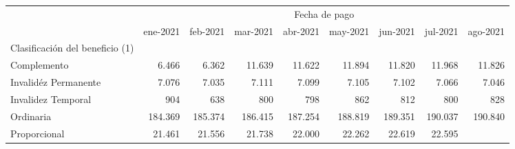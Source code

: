 \begin{tabular}{lllllllll}
\cline{1-9}
\multicolumn{1}{c}{} &
  \multicolumn{8}{|c}{Fecha de pago} \\
\multicolumn{1}{c}{} &
  \multicolumn{1}{|r}{ene-2021} &
  \multicolumn{1}{r}{feb-2021} &
  \multicolumn{1}{r}{mar-2021} &
  \multicolumn{1}{r}{abr-2021} &
  \multicolumn{1}{r}{may-2021} &
  \multicolumn{1}{r}{jun-2021} &
  \multicolumn{1}{r}{jul-2021} &
  \multicolumn{1}{r}{ago-2021} \\
\cline{1-9}
\multicolumn{1}{l}{Clasificación del beneficio (1)} &
  \multicolumn{1}{|r}{} &
  \multicolumn{1}{r}{} &
  \multicolumn{1}{r}{} &
  \multicolumn{1}{r}{} &
  \multicolumn{1}{r}{} &
  \multicolumn{1}{r}{} &
  \multicolumn{1}{r}{} &
  \multicolumn{1}{r}{} \\
\multicolumn{1}{l}{\hspace{1em}Complemento} &
  \multicolumn{1}{|r}{6.466} &
  \multicolumn{1}{r}{6.362} &
  \multicolumn{1}{r}{11.639} &
  \multicolumn{1}{r}{11.622} &
  \multicolumn{1}{r}{11.894} &
  \multicolumn{1}{r}{11.820} &
  \multicolumn{1}{r}{11.968} &
  \multicolumn{1}{r}{11.826} \\
\multicolumn{1}{l}{\hspace{1em}Invalidéz Permanente} &
  \multicolumn{1}{|r}{7.076} &
  \multicolumn{1}{r}{7.035} &
  \multicolumn{1}{r}{7.111} &
  \multicolumn{1}{r}{7.099} &
  \multicolumn{1}{r}{7.105} &
  \multicolumn{1}{r}{7.102} &
  \multicolumn{1}{r}{7.066} &
  \multicolumn{1}{r}{7.046} \\
\multicolumn{1}{l}{\hspace{1em}Invalidez Temporal} &
  \multicolumn{1}{|r}{904} &
  \multicolumn{1}{r}{638} &
  \multicolumn{1}{r}{800} &
  \multicolumn{1}{r}{798} &
  \multicolumn{1}{r}{862} &
  \multicolumn{1}{r}{812} &
  \multicolumn{1}{r}{800} &
  \multicolumn{1}{r}{828} \\
\multicolumn{1}{l}{\hspace{1em}Ordinaria} &
  \multicolumn{1}{|r}{184.369} &
  \multicolumn{1}{r}{185.374} &
  \multicolumn{1}{r}{186.415} &
  \multicolumn{1}{r}{187.254} &
  \multicolumn{1}{r}{188.819} &
  \multicolumn{1}{r}{189.351} &
  \multicolumn{1}{r}{190.037} &
  \multicolumn{1}{r}{190.840} \\
\multicolumn{1}{l}{\hspace{1em}Proporcional} &
  \multicolumn{1}{|r}{21.461} &
  \multicolumn{1}{r}{21.556} &
  \multicolumn{1}{r}{21.738} &
  \multicolumn{1}{r}{22.000} &
  \multicolumn{1}{r}{22.262} &
  \multicolumn{1}{r}{22.619} &
  \multicolumn{1}{r}{22.595} &

\end{tabular}
